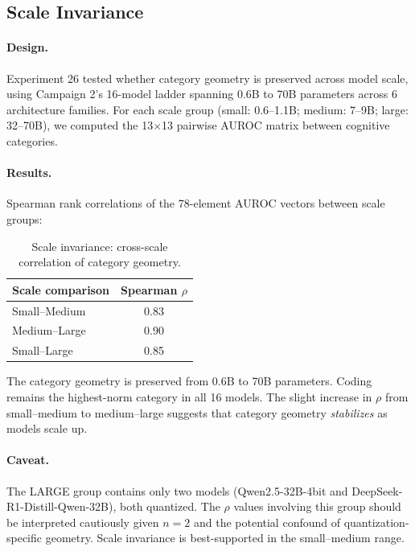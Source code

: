 \subsection{Scale Invariance}
\label{sec:scale}

\paragraph{Design.} Experiment 26 tested whether category geometry is preserved across model scale, using Campaign 2's 16-model ladder spanning 0.6B to 70B parameters across 6 architecture families. For each scale group (small: 0.6--1.1B; medium: 7--9B; large: 32--70B), we computed the 13$\times$13 pairwise AUROC matrix between cognitive categories.

\paragraph{Results.} Spearman rank correlations of the 78-element AUROC vectors between scale groups:

\begin{table}[H]
\centering
\caption{Scale invariance: cross-scale correlation of category geometry.}
\label{tab:scale}
\begin{tabular}{lc}
\toprule
\textbf{Scale comparison} & \textbf{Spearman $\rho$} \\
\midrule
Small--Medium & 0.83 \\
Medium--Large & 0.90 \\
Small--Large & 0.85 \\
\bottomrule
\end{tabular}
\end{table}

The category geometry is preserved from 0.6B to 70B parameters. Coding remains the highest-norm category in all 16 models. The slight increase in $\rho$ from small--medium to medium--large suggests that category geometry \emph{stabilizes} as models scale up.

\paragraph{Caveat.} The LARGE group contains only two models (Qwen2.5-32B-4bit and DeepSeek-R1-Distill-Qwen-32B), both quantized. The $\rho$ values involving this group should be interpreted cautiously given $n = 2$ and the potential confound of quantization-specific geometry. Scale invariance is best-supported in the small--medium range.

